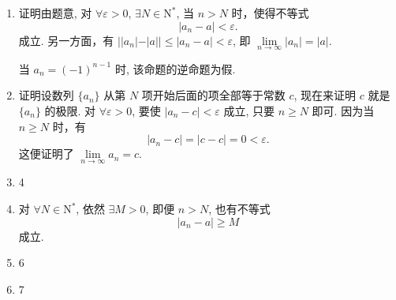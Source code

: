 \begin{enumerate}
\begin{enumerate}[(1)]
        \end{enumerate}
    \item %
        {\heiti 证明}\quad 由题意, 对 $\forall \varepsilon > 0$, $\exists N \in \mathrm{N}^*$, 当 $n > N$ 时，使得不等式
        \begin{equation*}
            |a_n - a| < \varepsilon.
        \end{equation*}
        成立. 另一方面，有 $| |a_n| - |a| | \leqslant \vert a_n - a \vert < \varepsilon$, 即 $\lim\limits_{n\to\infty}\vert a_n \vert = \vert a \vert$.
        
        当 $a_n = (-1)^{n-1}$ 时, 该命题的逆命题为假.
    \item %
        {\heiti 证明}\quad 设数列 $\{a_n\}$ 从第 $N$ 项开始后面的项全部等于常数 $c$, 现在来证明 $c$ 就是 $\{a_n\}$ 的极限.
        对 $\forall\varepsilon > 0$, 要使 $|a_n - c| < \varepsilon$ 成立, 只要 $n \geqslant N$ 即可.
        因为当 $n \geqslant N$ 时，有
        \[
            |a_n - c| = |c - c| = 0 < \varepsilon.    
        \]
        这便证明了 $\lim\limits_{n\to\infty}a_n = c$.
    \item 4
    \item %
        对 $\forall N \in \mathrm{N}^*$, 依然 $\exists M > 0$, 即便 $n > N$, 也有不等式
        \[
            |a_n - a| \geqslant M    
        \]
        成立.
    \item 6
    \item 7
\end{enumerate}

% 
